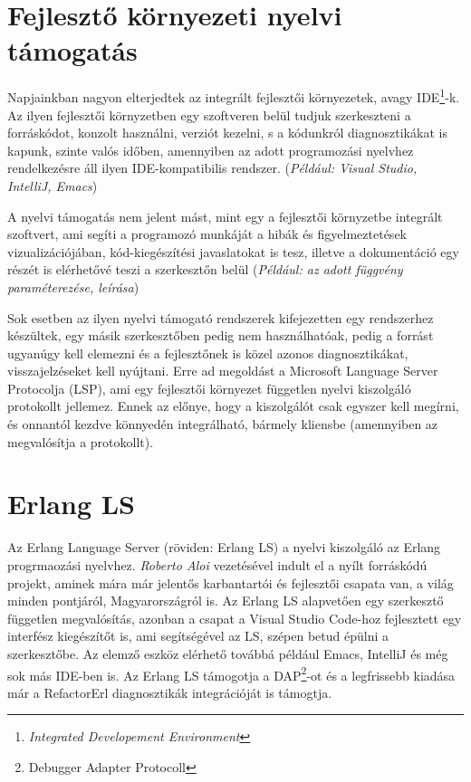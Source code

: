 \section{Fejlesztő környezeti nyelvi támogatás}
Napjainkban nagyon elterjedtek az integrált fejlesztői környezetek, avagy IDE\footnote{\textit{Integrated Developement Environment}}-k. Az ilyen fejlesztői környzetben egy szoftveren belül tudjuk szerkeszteni a forráskódot, konzolt használni, verziót kezelni, s a kódunkról diagnosztikákat is kapunk, szinte valós időben, amennyiben az adott programozási nyelvhez rendelkezésre áll ilyen IDE-kompatibilis rendszer. (\textit{Például: Visual Studio, IntelliJ, Emacs})

A nyelvi támogatás nem jelent mást, mint egy a fejlesztői környzetbe integrált szoftvert, ami segíti a programozó munkáját a hibák és figyelmeztetések vizualizációjában, kód-kiegészítési javaslatokat is tesz, illetve a dokumentáció egy részét is elérhetővé teszi a szerkesztőn belül (\textit{Például: az adott függvény paraméterezése, leírása})

Sok esetben az ilyen nyelvi támogató rendszerek kifejezetten egy rendszerhez készültek, egy másik szerkesztőben pedig nem használhatóak, pedig a forrást ugyanúgy kell elemezni és a fejlesztőnek is közel azonos diagnosztikákat, visszajelzéseket kell nyújtani. Erre ad megoldást a Microsoft Language Server Protocolja (LSP), ami egy fejlesztői környezet független nyelvi kiszolgáló protokollt jellemez. Ennek az előnye, hogy a kiszolgálót csak egyszer kell megírni, és onnantól kezdve könnyedén integrálható, bármely kliensbe (amennyiben az megvalósítja a protokollt).

\section{Erlang LS}
Az Erlang Language Server (röviden: Erlang LS) a nyelvi kiszolgáló az Erlang progrmaozási nyelvhez. \textit{Roberto Aloi} vezetésével indult el a nyílt forráskódú projekt, aminek mára már jelentős karbantartói és fejlesztői csapata van, a világ minden pontjáról, Magyarországról is. Az Erlang LS alapvetően egy szerkesztő független megvalósítás, azonban a csapat a Visual Studio Code-hoz fejlesztett egy interfész kiegészítőt is, ami segítségével az LS, szépen betud épülni a szerkesztőbe. Az elemző eszköz elérhető továbbá például Emacs, IntelliJ és még sok más IDE-ben is. Az Erlang LS támogotja a DAP\footnote{Debugger Adapter Protocoll}-ot és a legfrissebb kiadása már a RefactorErl diagnosztikák integrációját is támogtja.

